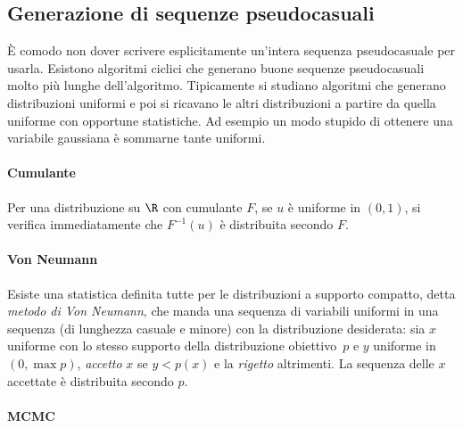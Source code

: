 \subsection{Generazione di sequenze pseudocasuali}

È comodo non dover scrivere esplicitamente un'intera sequenza pseudocasuale per
usarla. Esistono algoritmi ciclici che generano buone sequenze pseudocasuali
molto più lunghe dell'algoritmo. Tipicamente si studiano algoritmi che generano
distribuzioni uniformi e poi si ricavano le altri distribuzioni a partire da
quella uniforme con opportune statistiche. Ad esempio un modo stupido di
ottenere una variabile gaussiana è sommarne tante uniformi.

\paragraph{Cumulante}

Per una distribuzione su $\R$ con cumulante $F$,
se $u$ è uniforme in $(0,1)$,
si verifica immediatamente che $F^{-1}(u)$ è distribuita secondo $F$.

\paragraph{Von Neumann}

Esiste una statistica definita tutte per le distribuzioni a supporto compatto,
detta \emph{metodo di Von Neumann},
che manda una sequenza di variabili uniformi in una sequenza (di lunghezza casuale e minore) con la distribuzione desiderata:
sia $x$ uniforme con lo stesso supporto della distribuzione obiettivo~$p$
e $y$ uniforme in $(0,\max p)$, \emph{accetto} $x$ se $y<p(x)$ e la \emph{rigetto} altrimenti.
La sequenza delle $x$ accettate è distribuita secondo $p$.

\paragraph{MCMC}


